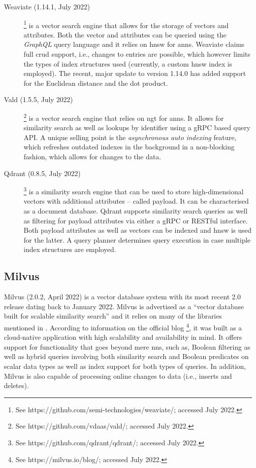 \begin{description}
    \item[Weaviate (1.14.1, July 2022)] \footnote{See https://github.com/semi-technologies/weaviate/; accessed July 2022.} is a vector search engine that allows for the storage of vectors and attributes. Both the vector and attributes can be queried using the \emph{GraphQL} query language and it relies on \acrshort{hnsw} \cite{Malkov:2018Efficient} for \acrshort{anns}. Weaviate claims full \acrshort{crud} support, i.e., changes to entries are possible, which however limits the types of index structures used (currently, a custom \acrshort{hnsw} index is employed). The recent, major update to version 1.14.0 has added support for the Euclidean distance and the dot product.
    \item[Vald (1.5.5, July 2022)] \footnote{See https://github.com/vdaas/vald/; accessed July 2022.} is a vector search engine that relies on \acrshort{ngt} for \acrshort{anns}. It allows for similarity search as well as lookups by identifier using a gRPC based query API. A unique selling point is the \emph{asynchronous auto indexing} feature, which refreshes outdated indexes in the background in a non-blocking fashion, which allows for changes to the data.
    \item[Qdrant (0.8.5, July 2022)] \footnote{See https://github.com/qdrant/qdrant/; accessed July 2022.} is a similarity search engine that can be used to store high-dimensional vectors with additional attributes -- called payload. It can be characterised as a document database. Qdrant supports similarity search queries as well as filtering for payload attributes via either a gRPC or RESTful interface. Both payload attributes as well as vectors can be indexed and \acrshort{hnsw} \cite{Malkov:2018Efficient} is used for the latter. A query planner determines query execution in case multiple index structures are employed.
\end{description}

\subsection{Milvus}
\label{section:milvus}

Milvus (2.0.2, April 2022) \cite{Wang:2021Milvus} is a vector database system with its most recent 2.0 release dating back to January 2022. Milvus is advertised as a ``vector database built for scalable similarity search'' and it relies on many of the libraries mentioned in . According to information on the official blog \footnote{See https://milvus.io/blog/; accessed July 2022.}, it was built as a cloud-native application with high scalability and availability in mind. It offers support for functionality that goes beyond mere \acrshort{nns}, such as, Boolean filtering as well as hybrid queries involving both similarity search and Boolean predicates on scalar data types as well as index support for both types of queries. In addition, Milvus is also capable of processing online changes to data (i.e., inserts and deletes).

